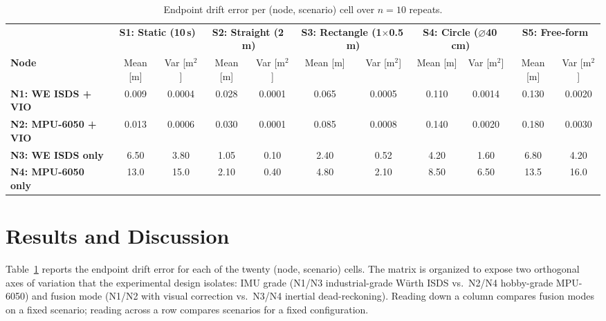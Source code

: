 \documentclass[conference]{IEEEtran}
\begin{document}
\begin{table}[!t]
\centering
\caption{Endpoint drift error per (node, scenario) cell over $n=10$ repeats.}
\label{tab:results}
\renewcommand{\arraystretch}{1.25}
\setlength{\tabcolsep}{4pt}
\begin{tabular}{l| cc | cc | cc | cc | cc}
\toprule
 & \multicolumn{2}{c|}{\textbf{S1: Static (10\,s)}} &
   \multicolumn{2}{c|}{\textbf{S2: Straight (2\,m)}} &
   \multicolumn{2}{c|}{\textbf{S3: Rectangle (1$\times$0.5\,m)}} &
   \multicolumn{2}{c|}{\textbf{S4: Circle ($\varnothing$40\,cm)}} &
   \multicolumn{2}{c}{\textbf{S5: Free-form}} \\
\textbf{Node} & Mean [m] & Var [m$^2$] & Mean [m] & Var [m$^2$] & Mean [m] & Var [m$^2$] & Mean [m] & Var [m$^2$] & Mean [m] & Var [m$^2$] \\
		\midrule
	\textbf{N1: WE ISDS + VIO}  & 0.009 & 0.0004 & 0.028 & 0.0001 & 0.065 & 0.0005 & 0.110 & 0.0014 & 0.130 & 0.0020 \\
	\textbf{N2: MPU-6050 + VIO} & 0.013 & 0.0006 & 0.030 & 0.0001 & 0.085 & 0.0008 & 0.140 & 0.0020 & 0.180 & 0.0030 \\
	\textbf{N3: WE ISDS only}   & 6.50  & 3.80   & 1.05  & 0.10   & 2.40  & 0.52   & 4.20  & 1.60   & 6.80  & 4.20   \\
	\textbf{N4: MPU-6050 only}  & 13.0  & 15.0   & 2.10  & 0.40   & 4.80  & 2.10   & 8.50  & 6.50   & 13.5  & 16.0   \\
	\bottomrule
\end{tabular}
\end{table}





\section{Results and Discussion}
\label{sec:results}

Table~\ref{tab:results} reports the endpoint drift error for each of
the twenty (node, scenario) cells. The matrix is organized to expose
two orthogonal axes of variation that the experimental design
isolates: IMU grade (N1/N3 industrial-grade W\"urth ISDS vs.\ N2/N4
hobby-grade MPU-6050) and fusion mode (N1/N2 with visual correction
vs.\ N3/N4 inertial dead-reckoning). Reading down a column compares
fusion modes on a fixed scenario; reading across a row compares
scenarios for a fixed configuration.
\end{document}
